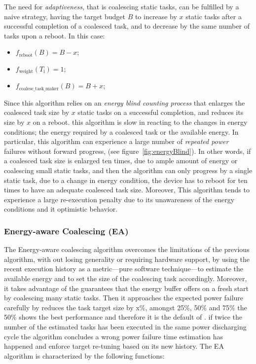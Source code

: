 The need for \emph{adaptiveness}, that is coalescing static tasks, can be fulfilled by a naive strategy, having the target budget $B$ to increase by $x$ static tasks after a successful completion of a coalesced task, and to decrease by the same number of tasks upon a reboot. In this case: 
\begin{itemize}
\item $f_\text{reboot}(B) = B - x $;
\item $f_\text{weight}(T_\text{i}) =  1$; 
\item $f_\text{coalesc\_task\_maker}(B) = B + x$; 
\end{itemize}
Since this algorithm relies on an \emph{energy blind counting process} that enlarges the coalesced task size by $x$ static tasks on a successful completion, and reduces its size by $x$ on a reboot. this algorithm is slow in reacting to the changes in energy conditions; the energy required by a coalesced task or the available energy. In particular, this algorithm can experience a large number of \emph{repeated power} failures without forward progress, (see figure~\ref{fig:energyBlind}). In other words, if a coalesced task size is enlarged ten times, due to ample amount of energy or coalescing small static tasks, and then the algorithm can only progress by a single static task, due to a change in energy condition, the device has to reboot for ten times to have an adequate coalesced task size. Moreover, This algorithm tends to experience a large re-execution penalty due to its unawareness of the energy conditions and it optimistic behavior.

\subsubsection{Energy-aware Coalescing (EA)}
\label{subsec:energyAware}
The Energy-aware coalescing algorithm overcomes the limitations of the previous algorithm, with out losing generality or requiring hardware support, by using the recent execution history as a metric---pure software technique---to estimate the available energy and to set the size of the coalescing task accordingly. Moreover, it takes advantage of the guarantees that the energy buffer offers on a fresh start by coalescing many static tasks. Then it approaches the expected power failure carefully by reduces the task target size by x\%, amongst 25\%, 50\% and 75\% the 50\% shows the best performance and therefore it is the default of \sys. if twice the number of the estimated tasks has been executed in the same power discharging cycle the algorithm concludes a wrong power failure time estimation has happened and enforce target re-tuning based on its new history. The EA algorithm is characterized by the following functions: 

